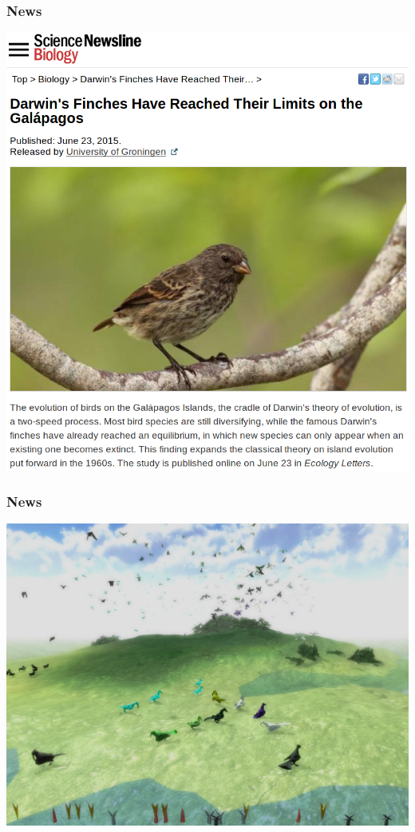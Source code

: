 \documentclass{beamer}
\begin{document}
\begin{frame}
  \frametitle{News\footnotemark}

  \includegraphics[height=0.8\textheight]{Press.png}


\end{frame}

\begin{frame}
  \frametitle{News}

  \includegraphics[height=0.8\textheight]{Finchy.png}

\end{frame}
\end{document}
